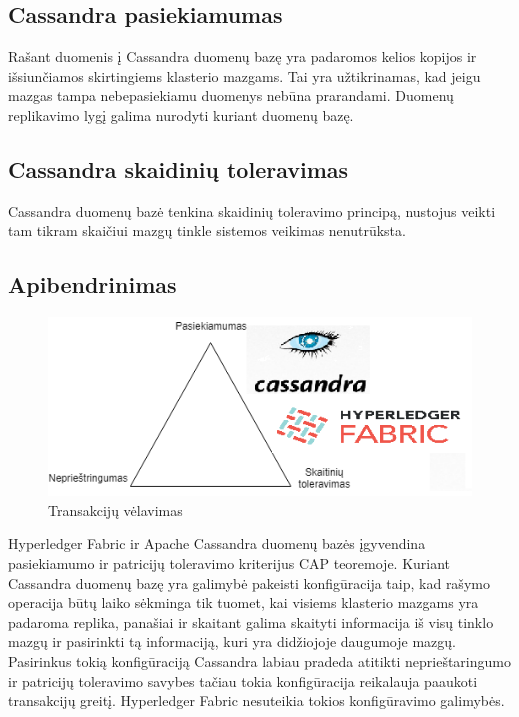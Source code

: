\documentclass{VUMIFPSkursinis}
\begin{document}
\subsection{Cassandra pasiekiamumas}
Rašant duomenis į Cassandra duomenų bazę yra padaromos kelios kopijos ir išsiunčiamos skirtingiems klasterio mazgams. Tai yra užtikrinamas, kad jeigu mazgas tampa nebepasiekiamu duomenys nebūna prarandami.\cite{CasDesk} Duomenų replikavimo lygį galima nurodyti kuriant duomenų bazę. 
\subsection{Cassandra skaidinių toleravimas}
Cassandra duomenų bazė tenkina skaidinių toleravimo principą, nustojus veikti tam tikram skaičiui mazgų tinkle sistemos veikimas nenutrūksta. \cite{CasDesk} 
\subsection{Apibendrinimas}
\begin{figure}[H]
\centering
\includegraphics[scale=1]{img/CAP}
\caption{Transakcijų vėlavimas} %
\label{img:mlp}
\end{figure}

Hyperledger Fabric ir Apache Cassandra duomenų bazės įgyvendina pasiekiamumo ir patricijų toleravimo kriterijus CAP teoremoje. Kuriant Cassandra duomenų bazę yra galimybė 
pakeisti konfigūracija taip, kad rašymo operacija būtų laiko sėkminga tik tuomet, kai visiems klasterio mazgams yra padaroma replika, panašiai ir skaitant galima skaityti informacija iš visų tinklo mazgų ir pasirinkti tą informaciją, kuri yra didžiojoje daugumoje mazgų. Pasirinkus tokią konfigūraciją Cassandra labiau pradeda atitikti neprieštaringumo ir patricijų toleravimo savybes tačiau tokia konfigūracija reikalauja paaukoti transakcijų greitį. Hyperledger Fabric nesuteikia tokios konfigūravimo galimybės.
\end{document}
